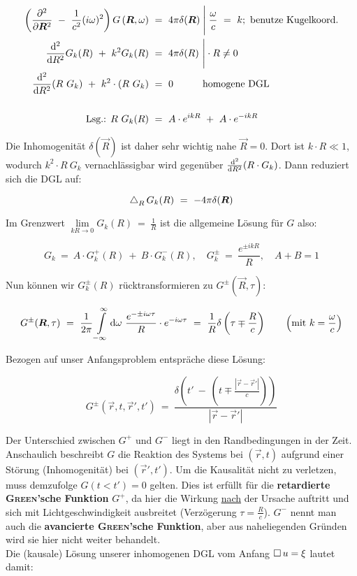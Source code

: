 \begin{align*}
\left(\pddiff{}{\vec{R}} \ - \ \frac{1}{c^2}(i\omega)^2\right)G\left(\vec{R},\omega\right)  \ &= \ 4\pi\delta(\vec{R})\;\Bigg | \; \frac{\omega}{c} \ = \ k; \text{ benutze Kugelkoord.}\\
\ddiff{}{R}G_k(R) \ + \ k^2 G_k(R) \ &= \ 4\pi\delta(R) \ \Bigg |\cdot R \neq 0\\
\ddiff{}{R}(R \ G_k) \ + \ k^2 \cdot (R \ G_k) \ &= \ 0 \quad\qquad\text{homogene DGL}\\
\ \\
\text{Lsg.: } R \ G_k(R) \ &= \ A\cdot e^{ikR} \ + \ A\cdot e^{-ikR}
\end{align*}

Die Inhomogenität $\delta(\vec{R})$ ist daher sehr wichtig nahe $\vec{R}=0$. Dort ist $k \cdot R \ll 1$, wodurch $k^2 \cdot R \ G_k$ vernachlässigbar wird gegenüber $\frac{\mathrm{d}^2{}}{\mathrm{d}{R}^2}(R\cdot G_k)$. Dann reduziert sich die DGL auf:

\begin{equation*}
\mathop{{}\bigtriangleup}\nolimits_R G_k(R)  \ = \ - 4 \pi \delta(\bm{R})
\end{equation*}

Im Grenzwert $\lim\limits_{kR \rightarrow 0}{G_k(R)}  \ = \ \frac{1}{R}$ ist die allgemeine Lösung für $G$ also:

\begin{equation*}
G_k  \ = \ A \cdot G_k^+(R) \ + \ B\cdot G_k^- (R), \quad G_k^{\pm}  \ = \ \frac{e^{\pm i k R}}{R},\quad A+B=1
\end{equation*}

Nun können wir $G_k^{\pm}(R)$ rücktransformieren zu $G^{\pm}(\vec{R},\tau)$:

\begin{equation*}
G^{\pm}(\vec{R},\tau)  \ = \  \frac{1}{2\pi} \Int{-\infty}{\infty}{\omega} \frac{e^{-\pm i\omega\tau}}{R}\cdot e^{-i\omega\tau}  \ = \ \frac{1}{R}\delta\left(\tau\mp \frac{R}{c}\right) \qquad \left(\text{mit }k=\frac{\omega}{c}\right)
\end{equation*}

Bezogen auf unser Anfangsproblem entspräche diese Lösung:

\begin{equation*}
G^{\pm}(\vec{r},t,\vec{r}',t')  \ = \ \frac{\delta\left(t' \ - \ \left(t \mp \frac{|\vec{r}-\vec{r}'|}{c}\right)\right)}{|\vec{r}-\vec{r}'|}
\end{equation*}

Der Unterschied zwischen $G^+$ und $G^-$ liegt in den Randbedingungen in der Zeit. Anschaulich beschreibt $G$ die Reaktion des Systems bei $(\vec{r},t)$ aufgrund einer Störung (Inhomogenität) bei $(\vec{r}',t')$. Um die Kausalität nicht zu verletzen, muss demzufolge $G(t<t')=0$ gelten. Dies ist erfüllt für die \textbf{retardierte \textsc{Green}'sche Funktion} $G^+$, da hier die Wirkung \underline{nach} der Ursache auftritt und sich mit Lichtgeschwindigkeit ausbreitet (Verzögerung $\tau = \frac{R}{c}$). $G^-$ nennt man auch die \textbf{avancierte \textsc{Green}'sche Funktion}, aber aus naheliegenden Gründen wird sie hier nicht weiter behandelt.\\
Die (kausale) Lösung unserer inhomogenen DGL vom Anfang $\mathop{{}\Box}\nolimits u = \xi$ lautet damit:


